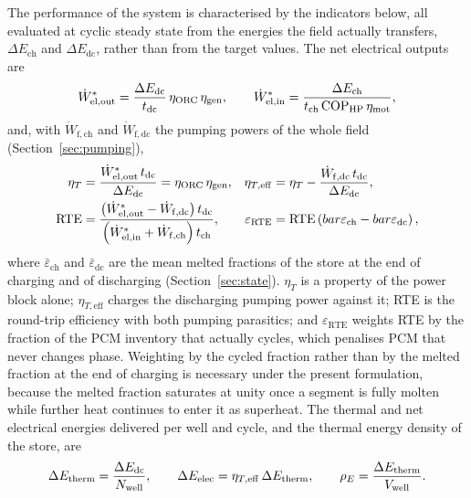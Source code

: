The performance of the system is characterised by the indicators below, all
evaluated at cyclic steady state from the energies the field actually
transfers, $\Delta E_\mathrm{ch}$ and $\Delta E_\mathrm{dc}$, rather than from
the target values. The net electrical outputs are
\begin{equation}
  \dot W_\mathrm{el,out}^{*}=\frac{\Delta E_\mathrm{dc}}{t_\mathrm{dc}}\,
     \eta_{\mathrm{ORC}}\,\eta_\mathrm{gen},
  \qquad
  \dot W_\mathrm{el,in}^{*}=\frac{\Delta E_\mathrm{ch}}{t_\mathrm{ch}\,
     \mathrm{COP}_{\mathrm{HP}}\,\eta_\mathrm{mot}},
  \label{eq:W-star}
\end{equation}
and, with $\dot W_\mathrm{f,ch}$ and $\dot W_\mathrm{f,dc}$ the pumping powers
of the whole field (Section~\ref{sec:pumping}),
\begin{align}
  \eta_{T}&=\frac{\dot W_\mathrm{el,out}^{*}\,t_\mathrm{dc}}{\Delta E_\mathrm{dc}}
           =\eta_{\mathrm{ORC}}\,\eta_\mathrm{gen},
  &
  \eta_{T,\mathrm{eff}}&=\eta_{T}-\frac{\dot W_\mathrm{f,dc}\,t_\mathrm{dc}}
           {\Delta E_\mathrm{dc}},
  \label{eq:etaT}\\
  \mathrm{RTE}&=\frac{\left(\dot W_\mathrm{el,out}^{*}-\dot W_\mathrm{f,dc}\right)t_\mathrm{dc}}
                     {\left(\dot W_\mathrm{el,in}^{*}+\dot W_\mathrm{f,ch}\right)t_\mathrm{ch}},
  &
  \varepsilon_\mathrm{RTE}&=\mathrm{RTE}\left(bar\varepsilon_\mathrm{ch}
           -bar\varepsilon_\mathrm{dc}\right),
  \label{eq:rte}
\end{align}
where $\bar\varepsilon_\mathrm{ch}$ and $\bar\varepsilon_\mathrm{dc}$ are the
mean melted fractions of the store at the end of charging and of discharging
(Section~\ref{sec:state}). $\eta_{T}$ is a property of the power block alone;
$\eta_{T,\mathrm{eff}}$ charges the discharging pumping power against it;
RTE is the round-trip efficiency with both pumping parasitics; and
$\varepsilon_\mathrm{RTE}$ weights RTE by the fraction of the PCM inventory
that actually cycles, which penalises PCM that never changes phase. Weighting
by the cycled fraction rather than by the melted fraction at the end of
charging is necessary under the present formulation, because the melted
fraction saturates at unity once a segment is fully molten while further heat
continues to enter it as superheat. The thermal and net electrical energies
delivered per well and cycle, and the thermal energy density of the store, are
\begin{equation}
  \Delta E_\mathrm{therm}=\frac{\Delta E_\mathrm{dc}}{N_{\mathrm{well}}},\qquad
  \Delta E_\mathrm{elec}=\eta_{T,\mathrm{eff}}\,\Delta E_\mathrm{therm},\qquad
  \rho_{E}=\frac{\Delta E_\mathrm{therm}}{V_{\mathrm{well}}}.
  \label{eq:dE}
\end{equation}

